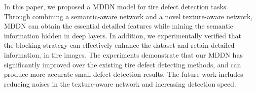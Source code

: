 \documentclass{article}
\begin{document}
In this paper, we proposed a MDDN model for tire defect detection tasks. Through combining a semantic-aware network and a novel texture-aware network, MDDN can obtain the essential detailed features while mining the semantic information hidden in deep layers. In addition, we experimentally verified that the blocking strategy can effectively enhance the dataset and retain detailed information, in tire images. The experiments demonstrate that our MDDN has significantly improved over the existing tire defect detecting methods, and can produce more accurate small defect detection results. The future work includes reducing noises in the texture-aware network and increasing detection speed.


\vfill\pagebreak





\end{document}

